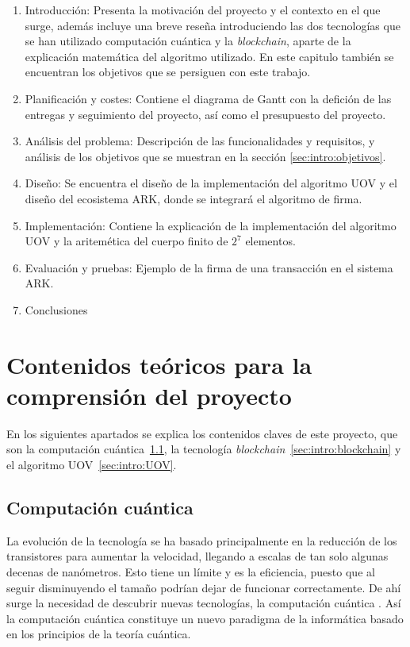 \begin{enumerate}
	\item Introducción: Presenta la motivación del proyecto y el contexto en el que surge, además incluye una breve reseña introduciendo las dos tecnologías que se han utilizado computación cuántica y la \textit{blockchain}, aparte de la explicación matemática del algoritmo utilizado. En este capitulo también se encuentran los objetivos que se persiguen con este trabajo.
	\item Planificación y costes: Contiene el diagrama de Gantt con la defición de las entregas y seguimiento del proyecto, así como el presupuesto del proyecto.
	\item Análisis del problema: Descripción de las funcionalidades y requisitos, y análisis de los objetivos que se muestran en la sección \ref{sec:intro:objetivos}.
	\item Diseño: Se encuentra el diseño de la implementación del algoritmo UOV y el diseño del ecosistema ARK, donde se integrará el algoritmo de firma.
	\item Implementación: Contiene la explicación de la implementación del algoritmo UOV y la aritemética del cuerpo finito de $2^7$ elementos.
	\item Evaluación y pruebas: Ejemplo de la firma de una transacción en el sistema ARK.
	\item Conclusiones
\end{enumerate}

\section{Contenidos teóricos para la comprensión del proyecto}

En los siguientes apartados se explica los contenidos claves de este proyecto, que son la computación cuántica\ \ref{sec:intro:cc}, la tecnología \textit{blockchain}\ \ref{sec:intro:blockchain} y el algoritmo UOV\ \ref{sec:intro:UOV}.

\subsection{Computación cuántica}\label{sec:intro:cc}

La evolución de la tecnología se ha basado principalmente en la reducción de los transistores para aumentar la velocidad, llegando a escalas de tan solo algunas decenas de nanómetros. Esto tiene un límite y es la eficiencia, puesto que al seguir disminuyendo el tamaño podrían dejar de funcionar correctamente. De ahí surge la necesidad de descubrir nuevas tecnologías, la computación cuántica \cite{computacion-cuantica-wiki}. Así la computación cuántica constituye un nuevo paradigma de la informática basado en los principios de la teoría cuántica.\\

